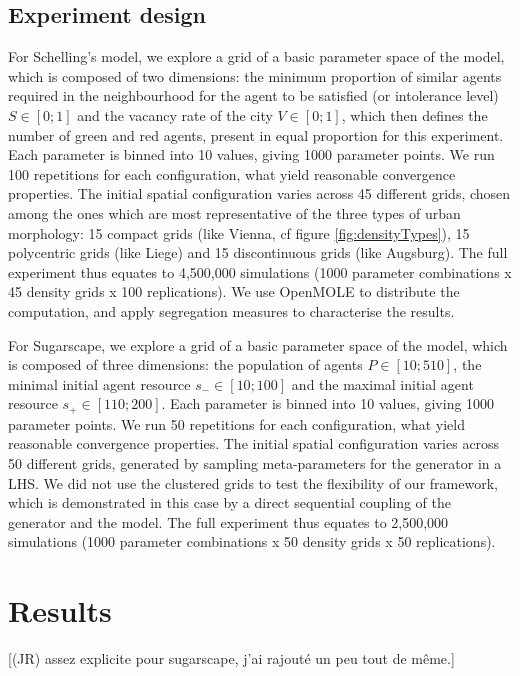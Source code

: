 \documentclass[Royal,sageh,times]{sagej}
\begin{document}
\subsection{Experiment design}
For Schelling's model, we explore a grid of a basic parameter space of the model, which is composed of two dimensions: the minimum proportion of similar agents required in the neighbourhood for the agent to be satisfied (or intolerance level) $S\in \left[0;1\right]$ and the vacancy rate of the city $V\in \left[0;1\right]$, which then defines the number of green and red agents, present in equal proportion for this experiment. Each parameter is binned into 10 values, giving 1000 parameter points. We run 100 repetitions for each configuration, what yield reasonable convergence properties. The initial spatial configuration varies across 45 different grids, chosen among the ones which are most representative of the three types of urban morphology: 15 compact grids (like Vienna, cf figure \ref{fig:densityTypes}), 15 polycentric grids (like Liege) and 15 discontinuous grids (like Augsburg). The full experiment thus equates to 4,500,000 simulations (1000 parameter combinations x 45 density grids x 100 replications). We use OpenMOLE to distribute the computation, and apply segregation measures to characterise the results. 

For Sugarscape, we explore a grid of a basic parameter space of the model, which is composed of three dimensions: the population of agents $P\in \left[10;510\right]$, the minimal initial agent resource $s_{-}\in \left[10;100\right]$ and the maximal initial agent resource $s_{+}\in \left[110;200\right]$. Each parameter is binned into 10 values, giving 1000 parameter points. We run 50 repetitions for each configuration, what yield reasonable convergence properties. The initial spatial configuration varies across 50 different grids, generated by sampling meta-parameters for the generator in a LHS. We did not use the clustered grids to test the flexibility of our framework, which is demonstrated in this case by a direct sequential coupling of the generator and the model. The full experiment thus equates to 2,500,000 simulations (1000 parameter combinations x 50 density grids x 50 replications). 


\section{Results}

[(JR) assez explicite pour sugarscape, j'ai rajouté un peu tout de même.]
\end{document}
